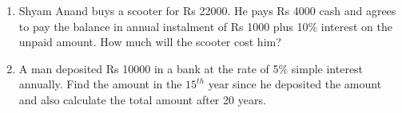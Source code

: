 \begin{enumerate}[label=\thesubsection.\arabic*, ref=\thesubsection.\theenumi]
\item Shyam Anand buys a scooter for Rs 22000. He pays Rs 4000 cash and agrees to
pay the balance in annual instalment of Rs 1000 plus 10\% interest on the unpaid
amount. How much will the scooter cost him?
\item A man deposited Rs 10000 in a bank at the rate of 5\% simple interest annually. Find the amount in the $15^{th}$ year since he deposited the amount and also calculate the total amount after 20 years.

\end{enumerate}
